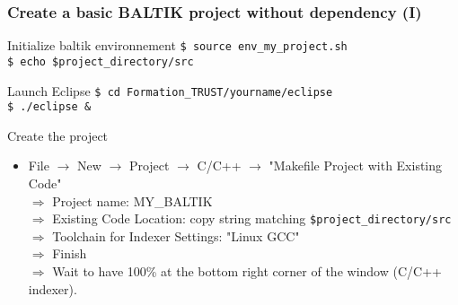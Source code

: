 \documentclass[10pt, hyperref={unicode=true,pdfusetitle, bookmarks=true,bookmarksnumbered=false,bookmarksopen=false, breaklinks=false,pdfborder={0 0 1},backref=true,colorlinks=true,linkcolor=darkblue,pageanchor, urlcolor=darkblue}]{beamer}
\begin{document}
\begin{frame}
\begin{columns}[c] 
\tableofcontents[sections={1-4},currentsection, currentsubsection]
\tableofcontents[sections={5-10},currentsection, currentsubsection]
\end{columns}
\end{frame}
\begin{frame}
\frametitle{Create a basic BALTIK project without dependency (I)}

\begin{block}{Initialize baltik environnement}
 \texttt{\$ source env\_my\_project.sh } \\
 \texttt{\$ echo \$project\_directory/src }
\end{block}

\begin{exampleblock}{Launch Eclipse}
\texttt{\$ cd Formation\_TRUST/yourname/eclipse } \\
\texttt{\$ ./eclipse \& }
\end{exampleblock}

\begin{exampleblock}{Create the project}
\begin{itemize}
\item File $\rightarrow$ New $\rightarrow$ Project $\rightarrow$ C/C++ $\rightarrow$ "Makefile Project with Existing Code" \\
  $\Rightarrow$ Project name: MY\_BALTIK \\
  $\Rightarrow$ Existing Code Location: copy string matching \texttt{\$project\_directory/src} \\
  $\Rightarrow$ Toolchain for Indexer Settings: "Linux GCC" \\
  $\Rightarrow$ Finish \\
  $\Rightarrow$ Wait to have 100\% at the bottom right corner of the window  (C/C++ indexer).
\end{itemize}
\end{exampleblock}

\end{frame}
\end{document}
